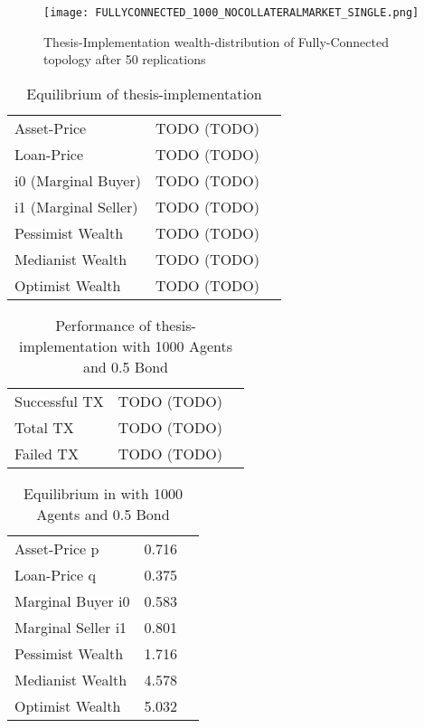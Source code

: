 \documentclass[Bachelorarbeit.tex]{subfiles}
\begin{document}
\begin{figure}[!htbp]
	\centering
  \texttt{[image: FULLYCONNECTED\_1000\_NOCOLLATERALMARKET\_SINGLE.png]}
	\caption{Thesis-Implementation wealth-distribution of Fully-Connected topology after 50 replications}
	\label{fig1}
\end{figure}

\begin{table}[h]
	\centering
	\caption{Equilibrium of thesis-implementation}
	\begin{tabular} { l c r }
		\hline
		Asset-Price & TODO (TODO) \\
		Loan-Price & TODO (TODO) \\
		i0 (Marginal Buyer) & TODO (TODO) \\
		i1 (Marginal Seller) & TODO (TODO) \\
		Pessimist Wealth & TODO (TODO) \\
		Medianist Wealth & TODO (TODO) \\
		Optimist Wealth & TODO (TODO) \\
		\hline
	\end{tabular}
\end{table}



\begin{table}[h]
	\centering
	\caption{Performance of thesis-implementation with 1000 Agents and 0.5 Bond}
	\begin{tabular} { l c r }
		\hline
		Successful TX & TODO (TODO) \\
		Total TX & TODO (TODO) \\
		Failed TX & TODO (TODO) \\
		\hline
	\end{tabular}
\end{table}

\begin{table}[h]
	\centering
	\caption{Equilibrium in \cite{Breuer2015} with 1000 Agents and 0.5 Bond }
	\begin{tabular} { l c r }
		\hline
		Asset-Price p & 0.716 \\
		Loan-Price q & 0.375 \\
		Marginal Buyer i0 & 0.583 \\
		Marginal Seller i1 & 0.801 \\
		Pessimist Wealth & 1.716 \\
		Medianist Wealth & 4.578 \\
		Optimist Wealth & 5.032 \\
		\hline
	\end{tabular}
\end{table}
\end{document}

